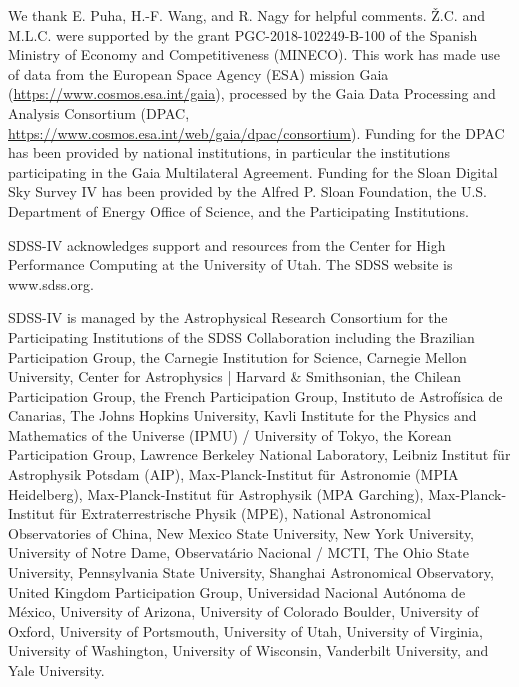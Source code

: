 \documentclass[twocolumn]{aastex63}
\begin{document}
\acknowledgments
We thank E. Puha, H.-F. Wang, and R. Nagy for helpful comments. \v{Z}.C. and M.L.C. were supported by the grant PGC-2018-102249-B-100 of the Spanish Ministry of Economy and Competitiveness (MINECO). This work has made use of data from the European Space Agency (ESA) mission Gaia (\url{https://www.cosmos.esa.int/gaia}), processed by the Gaia Data Processing and Analysis Consortium (DPAC, \url{https://www.cosmos.esa.int/web/gaia/dpac/consortium}). Funding for the DPAC has been provided by national institutions, in particular the institutions participating in the Gaia Multilateral Agreement. Funding for the Sloan Digital Sky 
Survey IV has been provided by the 
Alfred P. Sloan Foundation, the U.S. 
Department of Energy Office of 
Science, and the Participating 
Institutions. 

SDSS-IV acknowledges support and 
resources from the Center for High 
Performance Computing  at the 
University of Utah. The SDSS 
website is www.sdss.org.

SDSS-IV is managed by the 
Astrophysical Research Consortium 
for the Participating Institutions 
of the SDSS Collaboration including 
the Brazilian Participation Group, 
the Carnegie Institution for Science, 
Carnegie Mellon University, Center for 
Astrophysics | Harvard \& 
Smithsonian, the Chilean Participation 
Group, the French Participation Group, 
Instituto de Astrof\'isica de 
Canarias, The Johns Hopkins 
University, Kavli Institute for the 
Physics and Mathematics of the 
Universe (IPMU) / University of 
Tokyo, the Korean Participation Group, 
Lawrence Berkeley National Laboratory, 
Leibniz Institut f\"ur Astrophysik 
Potsdam (AIP),  Max-Planck-Institut 
f\"ur Astronomie (MPIA Heidelberg), 
Max-Planck-Institut f\"ur 
Astrophysik (MPA Garching), 
Max-Planck-Institut f\"ur 
Extraterrestrische Physik (MPE), 
National Astronomical Observatories of 
China, New Mexico State University, 
New York University, University of 
Notre Dame, Observat\'ario 
Nacional / MCTI, The Ohio State 
University, Pennsylvania State 
University, Shanghai 
Astronomical Observatory, United 
Kingdom Participation Group, 
Universidad Nacional Aut\'onoma 
de M\'exico, University of Arizona, 
University of Colorado Boulder, 
University of Oxford, University of 
Portsmouth, University of Utah, 
University of Virginia, University 
of Washington, University of 
Wisconsin, Vanderbilt University, 
and Yale University.

 

	
\end{document}
